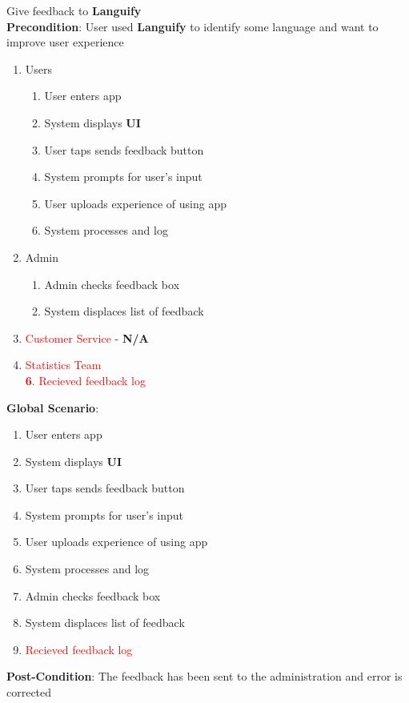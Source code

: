 \item Give feedback to \textbf{Languify}
	\\ \textbf{Precondition}: User used \textbf{Languify} to identify some language and want to improve user experience
	\begin{enumerate}[{\bf VP1.}]
		\item Users
			\begin{enumerate}[{\bf 1.}]
				\item User enters app
				\item System displays \textbf{UI}
				\item User taps sends feedback button
				\item System prompts for user’s input
				\item User uploads experience of using app
				\item System processes and log
			\end{enumerate}
		\item Admin
			\begin{enumerate}[{\bf 7.}]
				\item Admin checks feedback box
				\item System displaces list of feedback
			\end{enumerate}
		\item \textcolor{red}{Customer Service} - \textbf{N/A}
		\item \textcolor{red}{Statistics Team}\\
			\textcolor{red}{\textbf{6}. Recieved feedback log}
	\end{enumerate}
	\textbf{Global Scenario}:
	\begin{enumerate}[{\bf 1.}]
		\item User enters app
		\item System displays \textbf{UI}
		\item User taps sends feedback button
		\item System prompts for user’s input
		\item User uploads experience of using app
		\item System processes and log
		\item Admin checks feedback box
		\item System displaces list of feedback
		\item \textcolor{red}{Recieved feedback log}
	\end{enumerate}
	\textbf{Post-Condition}: The feedback has been sent to the administration and error is corrected